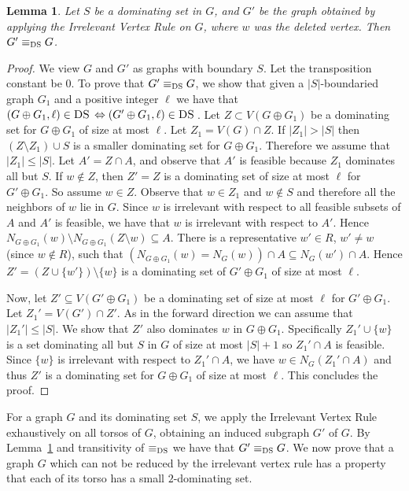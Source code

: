 \documentclass[11pt]{article}
\newtheorem{lemma}{Lemma}
\newcommand{\tDS}{{\texttt{\sc DS}}}
\begin{document}
 \begin{lemma}
 \label{lem:domseteqiv1}
Let $S$ be a dominating set in $G$, and $G'$ be the graph obtained by applying the Irrelevant Vertex Rule on $G$, where $w$ was the deleted vertex. Then $G' \equiv_{\tDS} G $.
\end{lemma}
 \begin{proof}
 We view $G$ and $G'$ as graphs with boundary $S$. 
 Let the transposition constant be $0$. To prove that $G' \equiv_{\tDS} G $, we show that given a $|S|$-boundaried graph $G_1$ and a positive 
 integer $\ell$ we have that $(G\oplus G_1,\ell)\in \tDS\, \Leftrightarrow (G'\oplus G_1,\ell)\in \tDS\,$. 
  Let $Z \subset V(G\oplus G_1)$  be a dominating set for $G\oplus G_1$ of size at most $\ell$.  Let $Z_1=V(G)\cap Z$. If $|Z_1|>|S|$ then 
  $(Z\setminus Z_1)\cup S$ is a smaller dominating set for $G\oplus G_1$. Therefore we assume that $|Z_1|\leq |S|$.  Let $A' = Z \cap A$, and observe that $A'$ is feasible because  $Z_1$ dominates all but $S$.  If $w \notin Z$, then $Z'=Z$ is a dominating set of size at most $\ell$ for 
  $G'\oplus G_1$. So assume $w\in Z$. Observe that $w\in Z_1$ and $w\notin S$ and therefore all the neighbors of $w$ lie in $G$. Since $w$ is irrelevant with respect to all feasible subsets of $A$ and $A'$ is feasible, we have that $w$ is irrelevant with respect to $A'$. Hence 
  $N_{G\oplus G_1}(w) \setminus N_{G\oplus G_1}(Z \setminus{w}) \subseteq A$. There is a representative $w' \in R$, $w' \neq w$ (since $w \notin R$), such that $(N_{G\oplus G_1}(w)=N_G(w)) \cap A \subseteq N_G(w') \cap A$. Hence $Z' = (Z \cup \{w'\}) \setminus \{w\}$  is a dominating set of 
  $G'\oplus G_1$ of size at most $\ell$. 
  
Now, let $Z' \subseteq V(G'\oplus G_1)$  be a dominating set of size at most $\ell$ for $G'\oplus G_1$.  Let  $Z_1'=V(G')\cap Z'$. As in the forward direction we can assume that $|Z_1'|\leq |S|$. We show that $Z'$ also dominates $w$ in $G\oplus G_1$. Specifically $Z_1' \cup \{w\}$ is a set dominating all but $S$ in $G$ of size at most $|S|+1$ so $Z_1' \cap A$ is feasible. Since $\{w\}$ is irrelevant with respect to $Z_1' \cap A$, we have $w \in N_G(Z_1' \cap A)$ and thus $Z'$ is a dominating set for $ G\oplus G_1$ of size at most $\ell$. This concludes the proof. 
 \end{proof}

For a graph $G$ and its dominating set $S$, we apply the Irrelevant Vertex Rule exhaustively on all torsos of $G$, obtaining an induced subgraph $G'$ of $G$. By Lemma~\ref{lem:domseteqiv1} and transitivity of $\equiv_{\tDS}$ we have that $G'\equiv_{\tDS}G$. We now prove that a graph $G$ which can not be reduced by the irrelevant vertex rule has a property that each of its torso has a small $2$-dominating set. 
\end{document}
